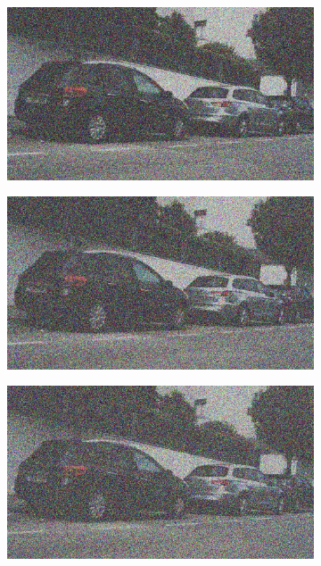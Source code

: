 \documentclass[a4paper]{ctexart}
\begin{document}
\begin{figure}[htbp]
\begin{subfigure}{0.08\textwidth}
				\label{fig：Gamma=0.3, Gauss Noise = 0.7}
			\end{subfigure}
			\begin{subfigure}{0.08\textwidth}
				\captionsetup{font=scriptsize}
				\includegraphics[width=\linewidth]{picture/Edge Detection/degrade/RGB_001 Gamma=0.3, Gauss Noise=0.8}
				\label{fig：Gamma=0.3, Gauss Noise = 0.8}
			\end{subfigure}
			\begin{subfigure}{0.08\textwidth}
				\captionsetup{font=scriptsize}
				\includegraphics[width=\linewidth]{picture/Edge Detection/degrade/RGB_001 Gamma=0.3, Gauss Noise=0.9}
				\label{fig：Gamma=0.3, Gauss Noise = 0.9}
			\end{subfigure}
			\begin{subfigure}{0.08\textwidth}
				\captionsetup{font=scriptsize}
				\includegraphics[width=\linewidth]{picture/Edge Detection/degrade/RGB_001 Gamma=0.3, Gauss Noise=1.0}

\end{subfigure}
\end{figure}
\end{document}

